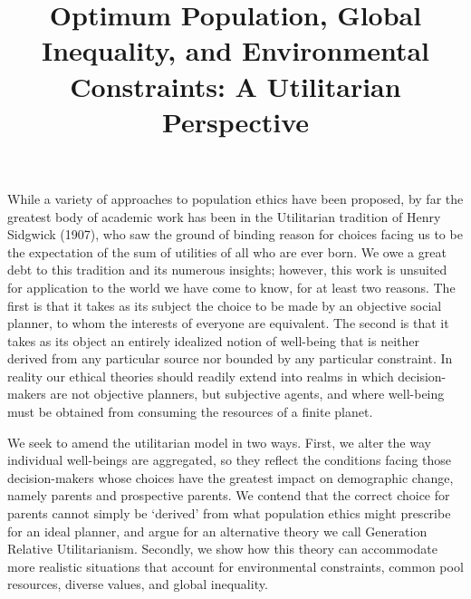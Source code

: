 \documentclass[man,11pt,a4paper,floatsintext]{apa7}
\title{Optimum Population, Global Inequality, and Environmental Constraints: A Utilitarian Perspective}
\begin{document}
\maketitle
\makeatletter
\renewcommand\@makefntext[1]{\linespread{1}\selectfont\raggedright\textsuperscript{\@thefnmark}~#1}
\makeatother

While a variety of approaches to population ethics have been proposed, by far the greatest body of academic work has been in the Utilitarian tradition of Henry Sidgwick (1907), who saw the ground of binding reason for choices facing us to be the expectation of the sum of utilities of all who are ever born. We owe a great debt to this tradition and its numerous insights; however, this work is unsuited for application to the world we have come to know, for at least two reasons. The first is that it takes as its subject the choice to be made by an objective social planner, to whom the interests of everyone are equivalent. The second is that it takes as its object an entirely idealized notion of well-being that is neither derived from any particular source nor bounded by any particular constraint. In reality our ethical theories should readily extend into realms in which decision-makers are not objective planners, but subjective agents, and where well-being must be obtained from consuming the resources of a finite planet.

We seek to amend the utilitarian model in two ways. First, we alter the way individual well-beings are aggregated, so they reflect the conditions facing those decision-makers whose choices have the greatest impact on demographic change, namely parents and prospective parents. We contend that the correct choice for parents cannot simply be `derived' from what population ethics might prescribe for an ideal planner, and argue for an alternative theory we call Generation Relative Utilitarianism. Secondly, we show how this theory can accommodate more realistic situations that account for environmental constraints, common pool resources, diverse values, and global inequality.
\end{document}
